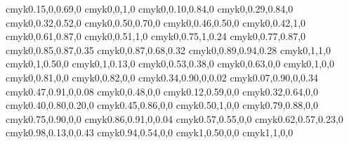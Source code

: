    {cmyk}{0.15,0,0.69,0}
        {cmyk}{0,0,1,0}
     {cmyk}{0,0.10,0.84,0}
     {cmyk}{0,0.29,0.84,0}
       {cmyk}{0,0.32,0.52,0}
         {cmyk}{0,0.50,0.70,0}
         {cmyk}{0,0.46,0.50,0}
  {cmyk}{0,0.42,1,0}
        {cmyk}{0,0.61,0.87,0}
   {cmyk}{0,0.51,1,0}
   {cmyk}{0,0.75,1,0.24}
     {cmyk}{0,0.77,0.87,0}
      {cmyk}{0,0.85,0.87,0.35}
        {cmyk}{0,0.87,0.68,0.32}
      {cmyk}{0,0.89,0.94,0.28}
           {cmyk}{0,1,1,0}
     {cmyk}{0,1,0.50,0}
     {cmyk}{0,1,0.13,0}
        {cmyk}{0,0.53,0.38,0}
 {cmyk}{0,0.63,0,0}
       {cmyk}{0,1,0,0}
     {cmyk}{0,0.81,0,0}
     {cmyk}{0,0.82,0,0}
      {cmyk}{0.34,0.90,0,0.02}
     {cmyk}{0.07,0.90,0,0.34}
       {cmyk}{0.47,0.91,0,0.08}
      {cmyk}{0,0.48,0,0}
       {cmyk}{0.12,0.59,0,0}
        {cmyk}{0.32,0.64,0,0}
    {cmyk}{0.40,0.80,0.20,0}
        {cmyk}{0.45,0.86,0,0}
          {cmyk}{0.50,1,0,0}
        {cmyk}{0.79,0.88,0,0}
   {cmyk}{0.75,0.90,0,0}
    {cmyk}{0.86,0.91,0,0.04}
    {cmyk}{0.57,0.55,0,0}
     {cmyk}{0.62,0.57,0.23,0}
  {cmyk}{0.98,0.13,0,0.43}
      {cmyk}{0.94,0.54,0,0}
     {cmyk}{1,0.50,0,0}
          {cmyk}{1,1,0,0}
